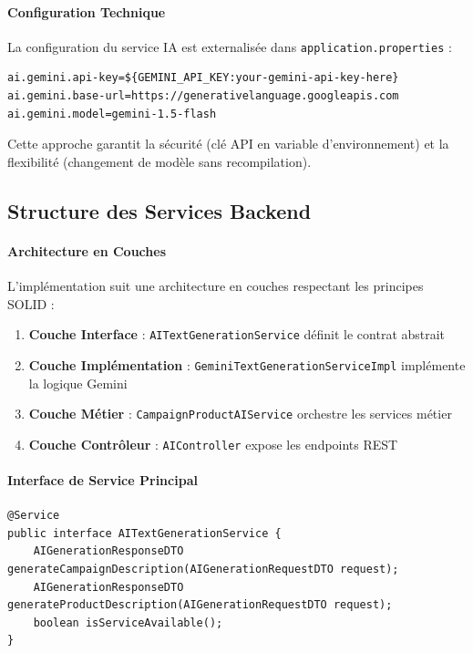 \paragraph{Configuration Technique}
La configuration du service IA est externalisée dans \texttt{application.properties} :
\begin{verbatim}
ai.gemini.api-key=${GEMINI_API_KEY:your-gemini-api-key-here}
ai.gemini.base-url=https://generativelanguage.googleapis.com
ai.gemini.model=gemini-1.5-flash
\end{verbatim}

Cette approche garantit la sécurité (clé API en variable d'environnement) et la flexibilité (changement de modèle sans recompilation).

\subsection{Structure des Services Backend}

\paragraph{Architecture en Couches}
L'implémentation suit une architecture en couches respectant les principes SOLID :

\begin{enumerate}
    \item \textbf{Couche Interface} : \texttt{AITextGenerationService} définit le contrat abstrait
    \item \textbf{Couche Implémentation} : \texttt{GeminiTextGenerationServiceImpl} implémente la logique Gemini
    \item \textbf{Couche Métier} : \texttt{CampaignProductAIService} orchestre les services métier
    \item \textbf{Couche Contrôleur} : \texttt{AIController} expose les endpoints REST
\end{enumerate}

\paragraph{Interface de Service Principal}
\begin{verbatim}
@Service
public interface AITextGenerationService {
    AIGenerationResponseDTO generateCampaignDescription(AIGenerationRequestDTO request);
    AIGenerationResponseDTO generateProductDescription(AIGenerationRequestDTO request);
    boolean isServiceAvailable();
}
\end{verbatim}

